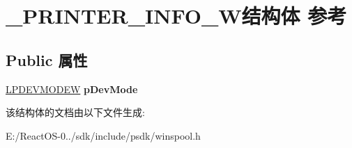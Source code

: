 \hypertarget{struct___p_r_i_n_t_e_r___i_n_f_o__9_w}{}\section{\+\_\+\+P\+R\+I\+N\+T\+E\+R\+\_\+\+I\+N\+F\+O\+\_\+W结构体 参考}
\label{struct___p_r_i_n_t_e_r___i_n_f_o__9_w}
\subsection*{Public 属性}
\begin{DoxyCompactItemize}
\item 
\mbox{\label{struct___p_r_i_n_t_e_r___i_n_f_o__9_w_a3f6af08fc24135db67166634987e4493}} 
\hyperlink{struct__devicemode_w}{L\+P\+D\+E\+V\+M\+O\+D\+EW} {\bfseries p\+Dev\+Mode}
\end{DoxyCompactItemize}


该结构体的文档由以下文件生成\+:\begin{DoxyCompactItemize}
\item 
E\+:/\+React\+O\+S-\/0../sdk/include/psdk/winspool.\+h\end{DoxyCompactItemize}
